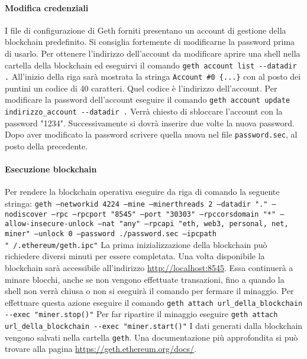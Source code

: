 \paragraph{Modifica credenziali}
I file di configurazione di Geth forniti presentano un account di gestione della blockchain predefinito. Si consiglia fortemente di modificarne la password prima di usarlo.
Per ottenere l'indirizzo dell'account da modificare aprire una shell nella cartella della blockchain ed eseguirvi il comando \newline
\texttt{geth account list -{}-datadir .} \newline
All'inizio della riga sarà mostrata la stringa \newline
\texttt{Account \#0 \{...\}} \newline con al posto dei puntini un codice di 40 caratteri. Quel codice è l'indirizzo dell'account. \newline
Per modificare la password dell'account eseguire il comando \newline
\texttt{geth account update indirizzo\_account -{}-datadir .} \newline
Verrà chiesto di sbloccare l'account con la password "1234". Successivamente si dovrà inserire due volte la nuova password. \newline
Dopo aver modificato la password scrivere quella nuova nel file \texttt{password.sec}, al posto della precedente.

\paragraph{Esecuzione blockchain}
Per rendere la blockchain operativa eseguire da riga di comando la seguente stringa:\newline
\texttt{geth --networkid 4224 --mine --minerthreads 2 --datadir "." --nodiscover --rpc --rpcport "8545" --port "30303" --rpccorsdomain "*" --allow-insecure-unlock --nat "any" --rpcapi "eth, web3, personal, net, miner" --unlock 0 --password ./password.sec --ipcpath "~/.ethereum/geth.ipc"} \newline
La prima inizializzazione della blockchain può richiedere diversi minuti per essere completata. Una volta disponibile la blockchain sarà accessibile all'indirizzo \url{http://localhost:8545}. Essa continuerà a minare blocchi, anche se non vengono effettuate transazioni, fino a quando la shell non verrà chiusa o non si eseguirà il comando per fermare il minaggio. Per effettuare questa azione eseguire il comando \newline
\texttt{geth attach url\_della\_blockchain -{}-exec "miner.stop()"} \newline
Per far ripartire il minaggio eseguire \newline
\texttt{geth attach url\_della\_blockchain -{}-exec "miner.start()"} \newline
I dati generati dalla blockchain vengono salvati nella cartella \texttt{geth}.
Una documentazione più approfondita si può trovare alla pagina \url{https://geth.ethereum.org/docs/}.


